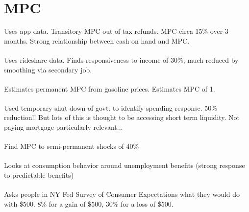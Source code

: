 \documentclass[titlepage,abstract]{econtex}
\begin{document}

	
\section{MPC}
\cite{gelman_what_2016}
Uses app data. Transitory MPC out of tax refunds. MPC circa 15\% over 3 months. Strong relationship between cash on hand and MPC.\\
\\
\cite{koustas_consumption_2018}
Uses rideshare data. Finds responsiveness to income of 30\%, much reduced by smoothing via secondary job.\\
\\
\cite{gelman_response_2016}
Estimates permanent MPC from gasoline prices. Estimates MPC of 1.\\
\\
\cite{gelman_how_2015}
Used temporary shut down of govt. to identify spending response. 50\% reduction!! But lots of this is thought to be accessing short term liquidity. Not paying mortgage particularly relevant...\\
\\
\cite{baker_debt_2015}
Find MPC to semi-permanent shocks of 40\% \\
\\
\cite{ganong_consumer_2017}
Looks at consumption behavior around unemployment benefits (strong response to predictable benefits) \\
\\
\cite{fuster_what_2018}
Asks people in NY Fed Survey of Consumer Expectations what they would do with \$500. 8\% for a gain of \$500, 30\% for a loss of \$500.
\end{document}
